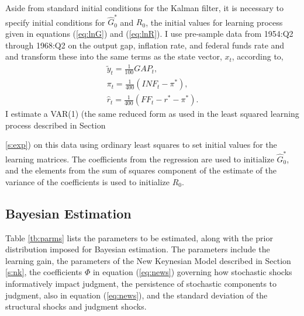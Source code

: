 \documentclass[12pt]{article}
\newcommand{\bdm}{\begin{displaymath}}
\newcommand{\edm}{\end{displaymath}}
\newcommand{\h}[1]{\hat{#1}}
\newcommand{\ds}{\displaystyle}
\begin{document}
Aside from standard initial conditions for the Kalman filter, it is necessary to specify initial conditions for $\h{G}_{0}^{*}$ and $R_{0}$, the initial values for learning process given in equations (\ref{eq:lnG}) and (\ref{eq:lnR}).  I use pre-sample data from 1954:Q2 through 1968:Q2 on the output gap, inflation rate, and federal funds rate and and transform these into the same terms as the state vector, $x_t$, according to,
\bdm \begin{array}{l}
\ds \tilde{y}_t = \frac{1}{100} GAP_t, \\ [1pc]
\ds \pi_t = \frac{1}{400} (INF_t - \pi^{*}), \\ [1pc]
\ds \h{r}_t = \frac{1}{400} (FF_t - r^{*} - \pi^*).
\end{array}
\edm
I estimate a VAR(1) (the same reduced form as used in the least squared learning process described in Section {\ref{s:exp}) on this data using ordinary least squares to set initial values for the learning matrices.  The coefficients from the regression are used to initialize $\h{G}_{0}^{*}$, and the elements from the sum of squares component of the estimate of the variance of the coefficients is used to initialize $R_{0}$.

\subsection{Bayesian Estimation}

Table \ref{tb:parms} lists the parameters to be estimated, along with the prior distribution imposed for Bayesian estimation.  The parameters include the learning gain, the parameters of the New Keynesian Model described in Section \ref{s:nk}, the coefficients $\Phi$ in equation (\ref{eq:news}) governing how stochastic shocks informatively impact judgment, the persistence of stochastic components to judgment, also in equation (\ref{eq:news}), and the standard deviation of the structural shocks and judgment shocks. 

}
\end{document}
